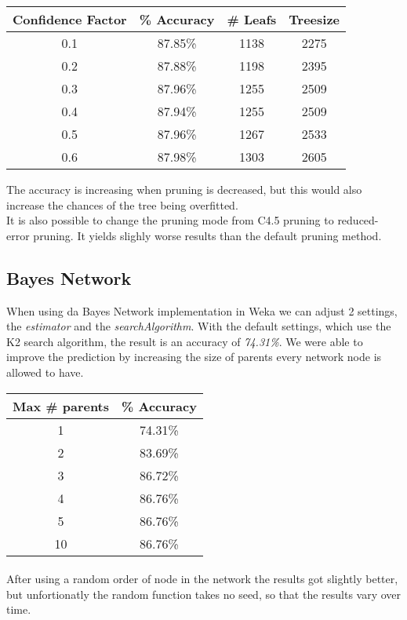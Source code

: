\documentclass{article}
\begin{document}
\begin{center}
\begin{tabular}{ c | c | c | c}
\textbf{Confidence Factor} & \textbf{\% Accuracy} & \textbf{\# Leafs} & \textbf{Treesize}\\
\hline
0.1 & 87.85\% & 1138 & 2275\\
0.2 & 87.88\% & 1198 & 2395\\
0.3 & 87.96\% & 1255 & 2509\\
0.4 & 87.94\% & 1255 & 2509\\
0.5 & 87.96\% & 1267 & 2533\\
0.6 & 87.98\% & 1303 & 2605\\
\end{tabular}
\end{center}

The accuracy is increasing when pruning is decreased, but this would also increase the chances of the tree being overfitted.\\
It is also possible to change the pruning mode from C4.5 pruning to reduced-error pruning. It yields slighly worse results than the default pruning method.


\subsection{Bayes Network}
When using da Bayes Network implementation in Weka we can adjust 2 settings, the \emph{estimator} and the \emph{searchAlgorithm}. With the default settings, which use the K2 search algorithm, the result is an accuracy of \emph{74.31\%}. We were able to improve the prediction by increasing the size of parents every network node is allowed to have.

\begin{center}
\begin{tabular}{ c | c }
\textbf{Max \# parents} & \textbf{\% Accuracy} \\
\hline
1  & 74.31\% \\
2  & 83.69\% \\
3  & 86.72\% \\
4  & 86.76\% \\
5  & 86.76\% \\
10 & 86.76\% \\
\end{tabular}
\end{center}

\paragraph{}After using a random order of node in the network the results got slightly better, but unfortionatly the random function takes no seed, so that the results vary over time.
\end{document}
